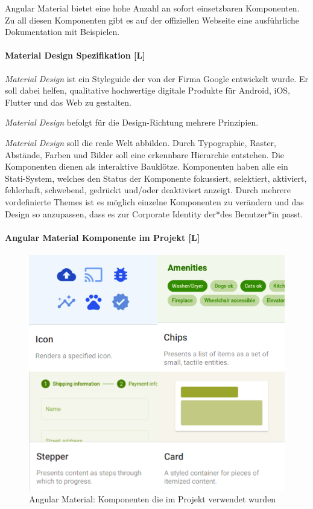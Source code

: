Angular Material bietet eine hohe Anzahl an sofort einsetzbaren Komponenten. Zu all diesen Komponenten gibt es auf der offiziellen Webseite eine ausführliche Dokumentation mit Beispielen. \cite{JavaPointAngularMaterial, WhatAngularMaterial}

\paragraph{Material Design Spezifikation [L]}
\emph{Material Design} ist ein Styleguide der von der Firma Google entwickelt wurde. Er soll dabei helfen, qualitative hochwertige digitale Produkte für Android, iOS, Flutter und das Web zu gestalten.

\emph{Material Design} befolgt für die Design-Richtung mehrere Prinzipien. 

\emph{Material Design} soll die reale Welt abbilden.
Durch Typographie, Raster, Abstände, Farben und Bilder soll eine erkennbare Hierarchie entstehen. Die Komponenten dienen als interaktive Bauklötze. Komponenten haben alle ein Stati-System, welches den Status der Komponente fokussiert, selektiert, aktiviert, fehlerhaft, schwebend, gedrückt und/oder deaktiviert anzeigt. Durch mehrere vordefinierte Themes ist es möglich einzelne Komponenten zu verändern und das Design so anzupassen, dass es zur Corporate Identity der*des Benutzer*in passt.\cite{MaterialDesign-Introduction}

\paragraph{Angular Material Komponente im Projekt [L]}

\begin{figure}
  \centering
  \includegraphics[scale=0.5]{pics/AngularMaterialKomponent.png}
  \caption{Angular Material: Komponenten die im Projekt verwendet wurden \cite{AngularComponents}}
  \label{architecture:frontend:angular-material-project-components}
\end{figure}

